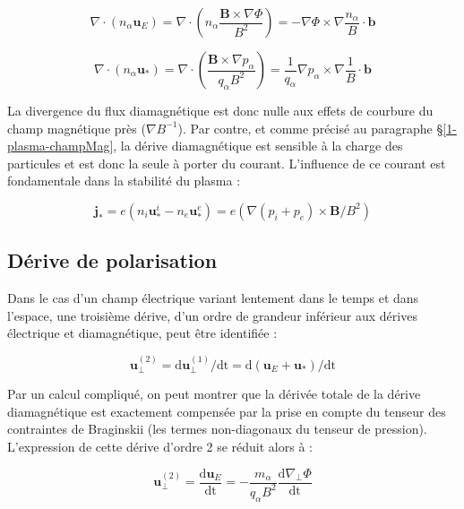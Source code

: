 \begin{refsection}
\begin{equation}
\nabla\cdot\left(n_\alpha\mathbf
u_E\right)=\nabla\cdot\left(n_\alpha\frac{\mathbf B\times\nabla
\Phi}{B^2}\right) =-\nabla \Phi\times\nabla\frac{n_\alpha}{B}\cdot \mathbf b
\end{equation}

\begin{equation}
\nabla\cdot\left(n_\alpha\mathbf
u_*\right)=\nabla\cdot\left(\frac{\mathbf B\times\nabla
p_\alpha}{q_\alpha B^2}\right)
=\frac{1}{q_\alpha}\nabla p_\alpha\times\nabla\frac{1}{B}\cdot \mathbf b
\end{equation}

La divergence du flux diamagnétique est donc nulle
aux effets de courbure du champ magnétique près ($\nabla B^{-1}$). Par contre, et comme
précisé au paragraphe \S\ref{1-plasma-champMag}, la dérive diamagnétique est 
sensible à la charge des particules et est donc la seule à porter du courant.
L'influence de ce courant est fondamentale dans la stabilité du plasma :

\begin{equation}
\mathbf j_*=e(n_i\mathbf u^i_*-n_e\mathbf
u^e_*)=e(\nabla(p_i+p_e)\times\mathbf B/B^2)
\end{equation}



\subsection{Dérive de polarisation}

Dans le cas d'un champ électrique variant lentement dans le temps et dans
l'espace, une troisième dérive, d'un ordre de grandeur inférieur aux dérives
électrique et diamagnétique, peut être identifiée : 

\begin{equation}
\label{1-vitessePol}
\mathbf{u}_\perp^{(2)}= \text{d}\mathbf
u_\perp^{(1)}/\text{dt}=\text{d}(\mathbf
u_E+\mathbf
u_*)/\text{dt}
\end{equation}

Par un calcul compliqué, on peut montrer que la dérivée totale de la dérive
diamagnétique est exactement compensée par la prise en compte du tenseur des
contraintes de Braginskii (les termes non-diagonaux du tenseur de
pression). L'expression de cette dérive d'ordre 2 se réduit alors à :

\begin{equation}
\label{1-vitessePol}
\mathbf{u}_\perp^{(2)}= \frac{\text{d}\mathbf
u_E}{\text{dt}}=-\frac{m_\alpha}{q_\alpha B^2}\frac{\text{d}\nabla_\perp
\Phi}{\text{dt}}
\end{equation}


\end{refsection}
